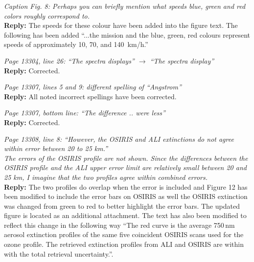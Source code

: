 \documentclass[12pt, notitlepage]{article}
\begin{document}
\hrulefill

\textit{Caption Fig. 8: Perhaps you can briefly mention what speeds blue, green and red
colors roughly correspond to.}\\

\textbf{Reply:} The speeds for these colour have been added into the figure text. The following has been added ``...the
  mission and the blue, green, red colours represent speeds of approximately
  10, 70, and 140~km/h.''

\hrulefill

\textit{Page 13304, line 26: ``The spectra displays'' $\rightarrow$ ``The spectra display''}\\

\textbf{Reply:} Corrected.

\hrulefill

\textit{Page 13307, lines 5 and 9: different spelling of ``Angstrom''}\\

\textbf{Reply:} All noted incorrect spellings have been corrected.

\hrulefill

\textit{Page 13307, bottom line: ``The difference .. were less''}\\

\textbf{Reply:} Corrected.

\hrulefill

\textit{Page 13308, line 8: ``However, the OSIRIS and ALI extinctions do not agree within error
between 20 to 25 km.''}\\

\textit{The errors of the OSIRIS profile are not shown. Since the differences between the
OSIRIS profile and the ALI upper error limit are relatively small between 20 and 25 km,
I imagine that the two profiles agree within combined errors.}\\

\textbf{Reply:} The two profiles do overlap when the error is included and Figure 12 has
been modified to include the error bars on OSIRIS as well the OSIRIS extinction was changed from green to red to better highlight the error bars. The updated figure is located as an additional attachment.
The text has also been modified to reflect this change in the following way ``The red
curve is the average 750\,nm aerosol extinction profiles of the
same five coincident OSIRIS scans used for the ozone profile. The
retrieved extinction profiles from ALI and OSIRIS are within with the
total retrieval uncertainty.''.
\end{document}
